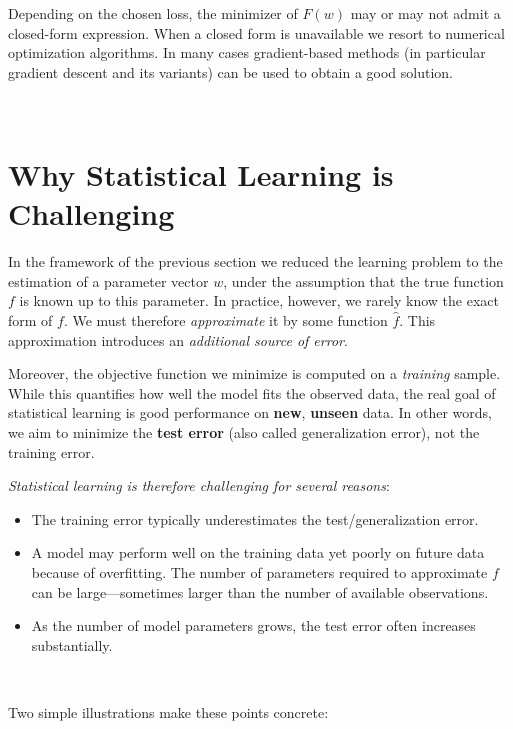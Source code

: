 \documentclass[
]{book}
\begin{document}
Depending on the chosen loss, the minimizer of \(F(w)\) may or may not admit a closed-form expression. When a closed form is unavailable we resort to numerical optimization algorithms. In many cases gradient-based methods (in particular gradient descent and its variants) can be used to obtain a good solution.

~

\section{Why Statistical Learning is Challenging}\label{why-statistical-learning-is-challenging}

In the framework of the previous section we reduced the learning problem to the estimation of a parameter vector \(w\), under the assumption that the true function \(f\) is known up to this parameter. In practice, however, we rarely know the exact form of \(f\). We must therefore \emph{approximate} it by some function \(\hat{f}\). This approximation introduces an \emph{additional source of error}.

Moreover, the objective function we minimize is computed on a \emph{training} sample. While this quantifies how well the model fits the observed data, the real goal of statistical learning is good performance on \textbf{new}, \textbf{unseen} data. In other words, we aim to minimize the \textbf{test error} (also called generalization error), not the training error.

\emph{Statistical learning is therefore challenging for several reasons}:

\begin{itemize}
\item
  The training error typically underestimates the test/generalization error.
\item
  A model may perform well on the training data yet poorly on future data because of overfitting.
  The number of parameters required to approximate \(f\) can be large---sometimes larger than the number of available observations.
\item
  As the number of model parameters grows, the test error often increases substantially.
\end{itemize}

~

Two simple illustrations make these points concrete:
\end{document}
